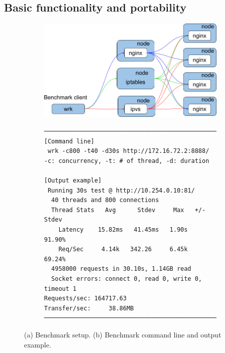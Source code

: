 \subsection{Basic functionality and portability}

\begin{figure}[tb]

  \begin{subfigure}[t]{\columnwidth}
    \includegraphics[width=0.9\columnwidth]{Figs/lb_single_schem}
    \caption{}
    \label{fig:lb_single_schem}
  \end{subfigure}

  \par\bigskip

  \begin{subfigure}[t]{\columnwidth}

\centering
\begin{Verbatim}[commandchars=\\\{\}]
───────────────────────────────────────────────────────
[Command line]
 wrk -c800 -t40 -d30s http://172.16.72.2:8888/
-c: concurrency, -t: # of thread, -d: duration

[Output example]
 Running 30s test @ http://10.254.0.10:81/
  40 threads and 800 connections
  Thread Stats   Avg      Stdev     Max   +/- Stdev
    Latency    15.82ms   41.45ms   1.90s    91.90%
    Req/Sec     4.14k   342.26     6.45k    69.24%
  4958000 requests in 30.10s, 1.14GB read
  Socket errors: connect 0, read 0, write 0, timeout 1
Requests/sec: 164717.63
Transfer/sec:     38.86MB
───────────────────────────────────────────────────────
\end{Verbatim}

    \caption{}
    \label{fig:bench_example}
  \end{subfigure}

  \caption{
    (a) Benchmark setup. (b) Benchmark command line and output example.
  }
  \label{fig:benchmark-schem}
\end{figure}


